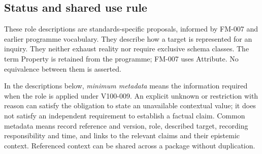 \documentclass[11pt,a4paper]{article}
\begin{document}
\subsection{Status and shared use rule}
These role descriptions are standards-specific proposals, informed by FM-007 and earlier programme vocabulary. They describe how a target is represented for an inquiry. They neither exhaust reality nor require exclusive schema classes. The term Property is retained from the programme; FM-007 uses Attribute. No equivalence between them is asserted.

In the descriptions below, \emph{minimum metadata} means the information required when the role is applied under V100-009. An explicit unknown or restriction with reason can satisfy the obligation to state an unavailable contextual value; it does not satisfy an independent requirement to establish a factual claim. Common metadata means record reference and version, role, described target, recording responsibility and time, and links to the relevant claims and their epistemic context. Referenced context can be shared across a package without duplication.


\end{document}
